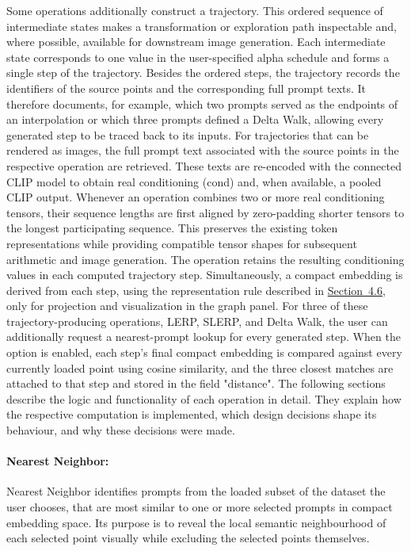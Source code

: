 Some operations additionally construct a trajectory. This ordered sequence of intermediate states makes a transformation or exploration path inspectable and, where possible, available for downstream image generation. Each intermediate state corresponds to one value in the user-specified alpha schedule and forms a single step of the trajectory.
Besides the ordered steps, the trajectory records the identifiers of the source points and the corresponding full prompt texts. It therefore documents, for example, which two prompts served as the endpoints of an interpolation or which three prompts defined a Delta Walk, allowing every generated step to be traced back to its inputs. For trajectories that can be rendered as images, the full prompt text associated with the source points in the respective operation are retrieved. These texts are re-encoded with the connected CLIP model to obtain real conditioning (cond) and, when available, a pooled CLIP output. Whenever an operation combines two or more real conditioning tensors, their sequence lengths are first aligned by zero-padding shorter tensors to the longest participating sequence. This preserves the existing token representations while providing compatible tensor shapes for subsequent arithmetic and image generation. The operation retains the resulting conditioning values in each computed trajectory step. Simultaneously, a compact embedding is derived from each step, using the representation rule described in \hyperref[sec:4.6]{Section~4.6}, only for projection and visualization in the graph panel. For three of these trajectory-producing operations, LERP, SLERP, and Delta Walk, the user can additionally request a nearest-prompt lookup for every generated step. When the option is enabled, each step's final compact embedding is compared against every currently loaded point using cosine similarity, and the three closest matches are attached to that step and stored in the field "distance". The following sections describe the logic and functionality of each operation in detail. They explain how the respective computation is implemented, which design decisions shape its behaviour, and why these decisions were made.

\paragraph{Nearest Neighbor:} Nearest Neighbor identifies prompts from the loaded subset of the dataset the user chooses, that are most similar to one or more selected prompts in compact embedding space. Its purpose is to reveal the local semantic neighbourhood of each selected point visually while excluding the selected points themselves.

